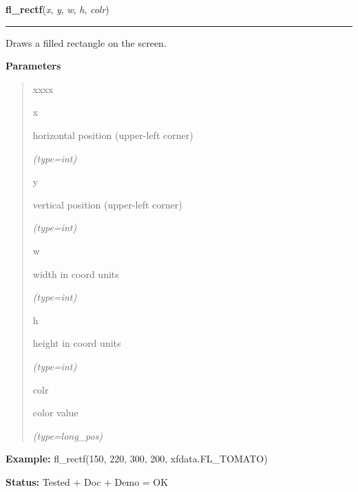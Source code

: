     \label{xformslib:flxbasic:fl_rectf}

    \vspace{0.5ex}

\hspace{.8\funcindent}\begin{boxedminipage}{\funcwidth}

    \raggedright \textbf{fl\_rectf}(\textit{x}, \textit{y}, \textit{w}, \textit{h}, \textit{colr})

    \vspace{-1.5ex}

    \rule{\textwidth}{0.5\fboxrule}
\setlength{\parskip}{2ex}
    Draws a filled rectangle on the screen.

\setlength{\parskip}{1ex}
      \textbf{Parameters}
      \vspace{-1ex}

      \begin{quote}
        \begin{Ventry}{xxxx}

          \item[x]

          horizontal position (upper-left corner)

            {\it (type=int)}

          \item[y]

          vertical position (upper-left corner)

            {\it (type=int)}

          \item[w]

          width in coord units

            {\it (type=int)}

          \item[h]

          height in coord units

            {\it (type=int)}

          \item[colr]

          color value

            {\it (type=long\_pos)}

        \end{Ventry}

      \end{quote}

\textbf{Example:} fl\_rectf(150, 220, 300, 200, xfdata.FL\_TOMATO)



\textbf{Status:} Tested + Doc + Demo = OK



    \end{boxedminipage}

